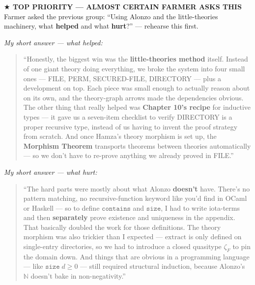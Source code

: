 \documentclass[12pt]{article}
\newenvironment{say}{%
  \par\medskip%
  \begin{quote}%
  \setlength{\parskip}{0.7em}%
  \large\itshape%
}{%
  \end{quote}%
  \medskip%
}
\begin{document}
\noindent\colorbox{action}{\color{white}\parbox{\dimexpr\linewidth-2\fboxsep}{%
  \vspace{0.2em}%
  {\large\bfseries $\bigstar$\; TOP PRIORITY --- ALMOST CERTAIN FARMER ASKS THIS}\\[0.2em]%
  {\small Farmer asked the previous group: ``Using Alonzo and the little-theories machinery, what \textbf{helped} and what \textbf{hurt}?'' --- rehearse this first.}%
  \vspace{0.2em}%
}}\par\vspace{0.6em}%

\textit{\color{pauseclr}My short answer --- what helped:}
\begin{say}
``Honestly, the biggest win was the \textbf{little-theories method} itself. Instead of one giant theory doing everything, we broke the system into four small ones --- FILE, PERM, SECURED-FILE, DIRECTORY --- plus a development on top. Each piece was small enough to actually reason about on its own, and the theory-graph arrows made the dependencies obvious. The other thing that really helped was \textbf{Chapter 10's recipe} for inductive types --- it gave us a seven-item checklist to verify DIRECTORY is a proper recursive type, instead of us having to invent the proof strategy from scratch. And once Hamza's theory morphism is set up, the \textbf{Morphism Theorem} transports theorems between theories automatically --- so we don't have to re-prove anything we already proved in FILE.''
\end{say}

\textit{\color{pauseclr}My short answer --- what hurt:}
\begin{say}
``The hard parts were mostly about what Alonzo \textbf{doesn't} have. There's no pattern matching, no recursive-function keyword like you'd find in OCaml or Haskell --- so to define $\mathtt{contains}$ and $\mathtt{size}$, I had to write iota-terms and then \textbf{separately} prove existence and uniqueness in the appendix. That basically doubled the work for those definitions. The theory morphism was also trickier than I expected --- $\mathrm{extract}$ is only defined on single-entry directories, so we had to introduce a closed quasitype $\zeta_F$ to pin the domain down. And things that are obvious in a programming language --- like $\mathtt{size}\;d \geq 0$ --- still required structural induction, because Alonzo's $\mathbb{N}$ doesn't bake in non-negativity.''
\end{say}
\end{document}
